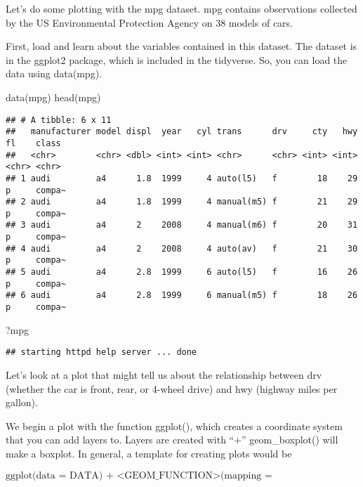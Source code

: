 \documentclass[
]{article}
\newenvironment{Shaded}{\begin{snugshade}}{\end{snugshade}}
\newcommand{\FunctionTok}[1]{\textcolor[rgb]{0.00,0.00,0.00}{#1}}
\newcommand{\NormalTok}[1]{#1}
\begin{document}
Let's do some plotting with the mpg dataset. mpg contains observations
collected by the US Environmental Protection Agency on 38 models of
cars.

First, load and learn about the variables contained in this dataset. The
dataset is in the ggplot2 package, which is included in the tidyverse.
So, you can load the data using data(mpg).

\begin{Shaded}
\begin{Highlighting}[]
\FunctionTok{data}\NormalTok{(mpg)}
\FunctionTok{head}\NormalTok{(mpg)}
\end{Highlighting}
\end{Shaded}

\begin{verbatim}
## # A tibble: 6 x 11
##   manufacturer model displ  year   cyl trans      drv     cty   hwy fl    class 
##   <chr>        <chr> <dbl> <int> <int> <chr>      <chr> <int> <int> <chr> <chr> 
## 1 audi         a4      1.8  1999     4 auto(l5)   f        18    29 p     compa~
## 2 audi         a4      1.8  1999     4 manual(m5) f        21    29 p     compa~
## 3 audi         a4      2    2008     4 manual(m6) f        20    31 p     compa~
## 4 audi         a4      2    2008     4 auto(av)   f        21    30 p     compa~
## 5 audi         a4      2.8  1999     6 auto(l5)   f        16    26 p     compa~
## 6 audi         a4      2.8  1999     6 manual(m5) f        18    26 p     compa~
\end{verbatim}

\begin{Shaded}
\begin{Highlighting}[]
\NormalTok{?mpg}
\end{Highlighting}
\end{Shaded}

\begin{verbatim}
## starting httpd help server ... done
\end{verbatim}

Let's look at a plot that might tell us about the relationship between
drv (whether the car is front, rear, or 4-wheel drive) and hwy (highway
miles per gallon).

We begin a plot with the function ggplot(), which creates a coordinate
system that you can add layers to. Layers are created with ``+''
geom\_boxplot() will make a boxplot. In general, a template for creating
plots would be

\(\text{ggplot(data = DATA) + 
  <GEOM_FUNCTION>(mapping = aes(<MAPPINGS>))}\)
\end{document}
